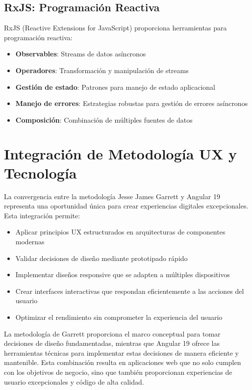 \subsection{RxJS: Programación Reactiva}

RxJS (Reactive Extensions for JavaScript) proporciona herramientas para programación reactiva:

\begin{itemize}
    \item \textbf{Observables}: Streams de datos asíncronos
    \item \textbf{Operadores}: Transformación y manipulación de streams
    \item \textbf{Gestión de estado}: Patrones para manejo de estado aplicacional
    \item \textbf{Manejo de errores}: Estrategias robustas para gestión de errores asíncronos
    \item \textbf{Composición}: Combinación de múltiples fuentes de datos
\end{itemize}

\section{Integración de Metodología UX y Tecnología}

La convergencia entre la metodología Jesse James Garrett y Angular 19 representa una oportunidad única para crear experiencias digitales excepcionales. Esta integración permite:

\begin{itemize}
    \item Aplicar principios UX estructurados en arquitecturas de componentes modernas
    \item Validar decisiones de diseño mediante prototipado rápido
    \item Implementar diseños responsive que se adapten a múltiples dispositivos
    \item Crear interfaces interactivas que respondan eficientemente a las acciones del usuario
    \item Optimizar el rendimiento sin comprometer la experiencia del usuario
\end{itemize}

La metodología de Garrett proporciona el marco conceptual para tomar decisiones de diseño fundamentadas, mientras que Angular 19 ofrece las herramientas técnicas para implementar estas decisiones de manera eficiente y mantenible. Esta combinación resulta en aplicaciones web que no solo cumplen con los objetivos de negocio, sino que también proporcionan experiencias de usuario excepcionales y código de alta calidad.
